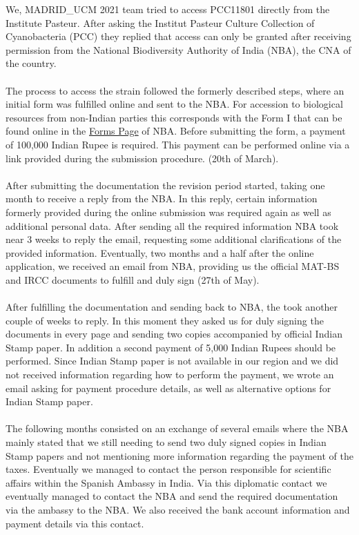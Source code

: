 \begin{formal}
We, MADRID\_UCM 2021 team tried to access PCC11801 directly from the Institute Pasteur. After asking the Institut Pasteur Culture Collection of Cyanobacteria (PCC) they replied that access can only be granted after receiving permission from the National Biodiversity Authority of India (NBA), the CNA of the country.  \\ \\
The process to access the strain followed the formerly described steps, where an initial form was fulfilled online and sent to the NBA. For accession to biological resources from non-Indian parties this corresponds with the Form I that can be found online in the \href{http://nbaindia.org/content/26/59/1/forms.html}{Forms Page} of NBA. Before submitting the form, a payment of 100,000 Indian Rupee is required. This payment can be performed online via a link provided during the submission procedure. (20th of March). \\ \\
After submitting the documentation the revision period started, taking one month to receive a reply from the NBA. In this reply, certain information formerly provided during the online submission was required again as well as additional personal data. After sending all the required information NBA took near 3 weeks to reply the email, requesting some additional clarifications of the provided information. Eventually, two months and a half after the online application, we received an email from NBA, providing us the official MAT-BS and IRCC documents to fulfill and duly sign (27th of May).\\ \\
After fulfilling the documentation and sending back to NBA, the took another couple of weeks to reply. In this moment they asked us for duly signing the documents in every page and sending two copies accompanied by official Indian Stamp paper. In addition a second payment of 5,000 Indian Rupees should be performed. Since Indian Stamp paper is not available in our region and we did not received information regarding how to perform the payment, we wrote an email asking for payment procedure details, as well as alternative options for Indian Stamp paper. \\ \\
The following months consisted on an exchange of several emails where the NBA mainly stated that we still needing to send two duly signed copies in Indian Stamp papers and not mentioning more information regarding the payment of the taxes. Eventually we managed to contact the person responsible for scientific affairs within the Spanish Ambassy in India. Via this diplomatic contact we eventually managed to contact the NBA and send the required documentation via the ambassy to the NBA. We also received the bank account information and payment details via this contact. \\ \\

\end{formal}
